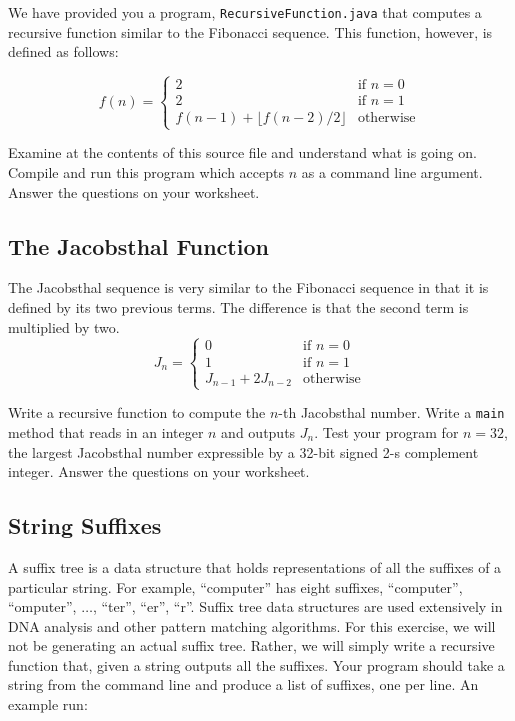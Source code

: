 \documentclass[12pt]{scrartcl}
\begin{document}
We have provided you a program, \texttt{RecursiveFunction.java} 
that computes a recursive function similar to the Fibonacci sequence.  
This function, however, is defined as follows: 

$$f(n) = \left\{
\begin{array}{ll}
2 & \textrm{if } n = 0 \\
2 & \textrm{if } n = 1 \\
f(n-1) + \lfloor f(n-2) / 2 \rfloor & \textrm{otherwise}
\end{array}
\right.$$

Examine at the contents of this source file and understand what is 
going on.  Compile and run this program which accepts $n$ as a 
command line argument.  Answer the questions on your worksheet.

\subsection{The Jacobsthal Function}

The Jacobsthal sequence is very similar to the Fibonacci sequence 
in that it is defined by its two previous terms.  The difference is that 
the second term is multiplied by two.  
$$J_n = \left\{
\begin{array}{ll}
0 & \textrm{if } n = 0 \\
1 & \textrm{if } n = 1 \\
J_{n-1} + 2J_{n-2} & \textrm{otherwise}
\end{array}
\right.$$

Write a recursive function to compute the $n$-th Jacobsthal number.  
Write a \texttt{main} method that reads in an integer $n$ and 
outputs $J_n$.  Test your program for $n = 32$, the largest Jacobsthal 
number expressible by a 32-bit signed 2-s complement integer.  
Answer the questions on your worksheet.

\subsection{String Suffixes}

A suffix tree is a data structure that holds representations of all the 
suffixes of a particular string.  For example, ``computer'' has eight 
suffixes, ``computer'', ``omputer'', $\ldots$, ``ter'', ``er'', ``r''.  Suffix 
tree data structures are used extensively in DNA analysis and other 
pattern matching algorithms.  For this exercise, we will not be 
generating an actual suffix tree.  Rather, we will simply write a 
recursive function that, given a string outputs all the suffixes.  
Your program should take a string from the command line and 
produce a list of suffixes, one per line.  An example run: 
\end{document}
